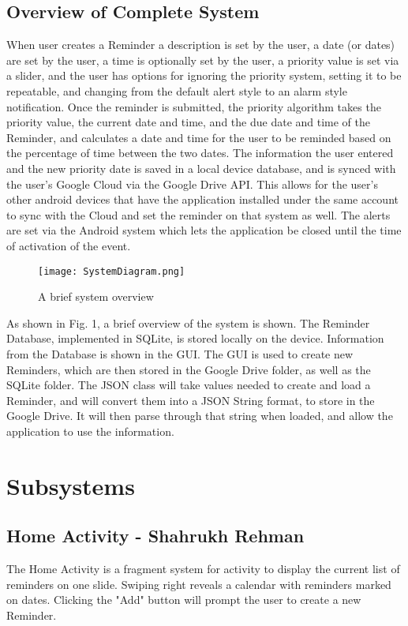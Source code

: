 \documentclass[12pt]{article}
\begin{document}
\subsection{Overview of Complete System}
When user creates a Reminder a description is set by the user, a date (or dates)  are set by the user, a time is optionally set by the user, a priority value is set via a slider, and the user has options for ignoring the priority system, setting it to be repeatable, and changing from the default alert style to an alarm style notification. Once the reminder is submitted, the priority algorithm takes the priority value, the current date and time, and the due date and time of the Reminder, and calculates a date and time for the user to be reminded based on the percentage of time between the two dates. The information the user entered and the new priority date is saved in a local device database, and is synced with the user's Google Cloud via the Google Drive API. This allows for the user's other android devices that have the application installed under the same account to sync with the Cloud and set the reminder on that system as well. The alerts are set via the Android system which lets the application be closed until the time of activation of the event.

\begin{figure}[h]
\texttt{[image: SystemDiagram.png]}
\centering
\caption{A brief system overview}
\end{figure}

As shown in Fig. 1, a brief overview of the system is shown. The Reminder Database, implemented in SQLite, is stored locally on the device. Information from the Database is shown in the GUI. The GUI is used to create new Reminders, which are then stored in the Google Drive folder, as well as the SQLite folder. The JSON class will take values needed to create and load a Reminder, and will convert them into a JSON String format, to store in the Google Drive. It will then parse through that string when loaded, and allow the application to use the information. 

\section{Subsystems}
\subsection{Home Activity - Shahrukh Rehman}
The Home Activity is a fragment system for activity to display the current list of reminders on one slide. Swiping right reveals a calendar with reminders marked on dates. Clicking the "Add" button will prompt the user to create a new Reminder. 
\end{document}

